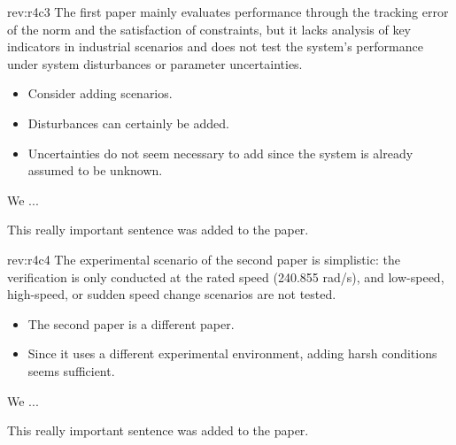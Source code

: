 \documentclass[12pt,english]{reviewresponse}
\begin{document}
\begin{revcomment}[2]{rev:r4c3}
    The first paper mainly evaluates performance through the tracking error of the norm and the satisfaction of constraints, but it lacks analysis of key indicators in industrial scenarios and does not test the system's performance under system disturbances or parameter uncertainties.
\end{revcomment}

\begin{howtoanswer}
    \begin{itemize}
        \item Consider adding scenarios.
        \item Disturbances can certainly be added.
        \item Uncertainties do not seem necessary to add since the system is already assumed to be unknown.
    \end{itemize}
\end{howtoanswer}

\begin{revresponse}
    We ...
    \begin{changes}
        This really important sentence was added to the paper.
    \end{changes}
\end{revresponse}

\begin{revcomment}[2]{rev:r4c4}
    The experimental scenario of the second paper is simplistic: the verification is only conducted at the rated speed (240.855 rad/s), and low-speed, high-speed, or sudden speed change scenarios are not tested.
\end{revcomment}

\begin{howtoanswer}
    \begin{itemize}
        \item The second paper is a different paper.
        \item Since it uses a different experimental environment, adding harsh conditions seems sufficient.
    \end{itemize}
\end{howtoanswer}

\begin{revresponse}
    We ...
    \begin{changes}
        This really important sentence was added to the paper.
    \end{changes}
\end{revresponse}
\end{document}
